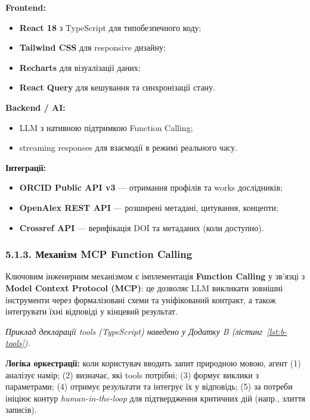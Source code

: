 \textbf{Frontend:}
\begin{itemize}[leftmargin=*,itemsep=0.2em]
\item \textbf{React 18} з TypeScript для типобезпечного коду;
\item \textbf{Tailwind CSS} для responsive дизайну;
\item \textbf{Recharts} для візуалізації даних;
\item \textbf{React Query} для кешування та синхронізації стану.
\end{itemize}

\textbf{Backend / AI:}
\begin{itemize}[leftmargin=*,itemsep=0.2em]
\item LLM з нативною підтримкою Function Calling;
\item streaming responses для взаємодії в режимі реального часу.
\end{itemize}

\textbf{Інтеграції:}
\begin{itemize}[leftmargin=*,itemsep=0.2em]
\item \textbf{ORCID Public API v3} --- отримання профілів та works дослідників;
\item \textbf{OpenAlex REST API} --- розширені метадані, цитування, концепти;
\item \textbf{Crossref API} --- верифікація DOI та метаданих (коли доступно).
\end{itemize}

\subsubsection*{5.1.3. Механізм MCP Function Calling}

Ключовим інженерним механізмом є імплементація \textbf{Function Calling} у зв'язці з \textbf{Model Context Protocol (MCP)}: це дозволяє LLM викликати зовнішні інструменти через формалізовані схеми та уніфікований контракт, а також інтегрувати їхні відповіді у кінцевий результат.

\textit{Приклад декларації tools (TypeScript) наведено у Додатку B (лістинг~\ref{lst:b-tools}).}

\textbf{Логіка оркестрації:} коли користувач вводить запит природною мовою, агент (1) аналізує намір; (2) визначає, які tools потрібні; (3) формує виклики з параметрами; (4) отримує результати та інтегрує їх у відповідь; (5) за потреби ініціює контур \textit{human-in-the-loop} для підтвердження критичних дій (напр., злиття записів).

